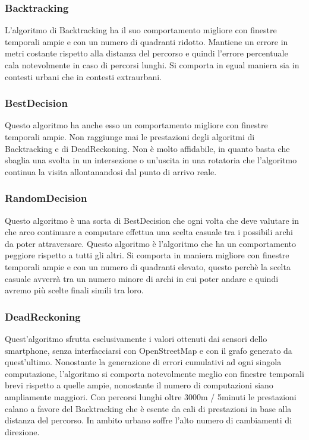 \documentclass[12pt,a4paper,openright,twoside]{report}
\begin{document}
\subsubsection{Backtracking}
L'algoritmo di Backtracking ha il suo comportamento migliore con finestre temporali ampie e con un numero di quadranti ridotto. Mantiene un errore in metri  costante rispetto alla distanza del percorso e quindi l'errore percentuale cala notevolmente in caso di percorsi lunghi. Si comporta in egual maniera sia in contesti urbani che in contesti extraurbani.

\subsubsection{BestDecision}
Questo algoritmo ha anche esso un comportamento migliore con finestre temporali ampie. Non raggiunge mai le prestazioni degli algoritmi di Backtracking e di DeadReckoning. Non è molto affidabile, in quanto basta che sbaglia una svolta in un intersezione o un'uscita in una rotatoria che l'algoritmo continua la visita allontanandosi dal punto di arrivo reale.

\subsubsection{RandomDecision}
Questo algoritmo è una sorta di BestDecision che ogni volta che deve valutare in che arco continuare a computare effettua una scelta casuale tra i possibili archi da poter attraversare. Questo algoritmo è l'algoritmo che ha un comportamento peggiore rispetto a tutti gli altri. Si comporta in maniera migliore con finestre temporali ampie e con un numero di quadranti elevato, questo perchè la scelta casuale avverrà tra un numero minore di archi in cui poter andare e quindi avremo più scelte finali simili tra loro.

\subsubsection{DeadReckoning}
Quest'algoritmo sfrutta esclusivamente i valori ottenuti dai sensori dello smartphone, senza interfacciarsi con OpenStreetMap e con il grafo generato da quest'ultimo. Nonostante la generazione di errori cumulativi ad ogni singola computazione, l'algoritmo si comporta notevolmente meglio con finestre temporali brevi rispetto a quelle ampie, nonostante il numero di computazioni siano ampliamente maggiori.
Con percorsi lunghi oltre 3000m / 5minuti le prestazioni calano a favore del Backtracking che è esente da cali di prestazioni in base alla distanza del percorso. In ambito urbano soffre l'alto numero di cambiamenti di direzione.
\end{document}
